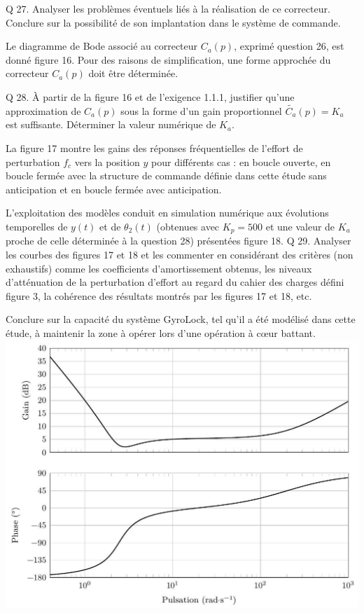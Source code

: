 \documentclass[10pt]{article}
\begin{document}
Q 27. Analyser les problèmes éventuels liés à la réalisation de ce correcteur. Conclure sur la possibilité de son implantation dans le système de commande.

Le diagramme de Bode associé au correcteur $C_{a}(p)$, exprimé question 26, est donné figure 16. Pour des raisons de simplification, une forme approchée du correcteur $C_{a}(p)$ doit être déterminée.

Q 28. À partir de la figure 16 et de l'exigence 1.1.1, justifier qu'une approximation de $C_{a}(p)$ sous la forme d'un gain proportionnel $\widetilde{C_{a}}(p)=K_{a}$ est suffisante. Déterminer la valeur numérique de $K_{a}$.

La figure 17 montre les gains des réponses fréquentielles de l'effort de perturbation $f_{c}$ vers la position $y$ pour différents cas : en boucle ouverte, en boucle fermée avec la structure de commande définie dans cette étude sans anticipation et en boucle fermée avec anticipation.

L'exploitation des modèles conduit en simulation numérique aux évolutions temporelles de $y(t)$ et de $\theta_{2}(t)$ (obtenues avec $K_{p}=500$ et une valeur de $K_{a}$ proche de celle déterminée à la question 28) présentées figure 18. Q 29. Analyser les courbes des figures 17 et 18 et les commenter en considérant des critères (non exhaustifs) comme les coefficients d'amortissement obtenus, les niveaux d'atténuation de la perturbation d'effort au regard du cahier des charges défini figure 3, la cohérence des résultats montrés par les figures 17 et 18, etc.

Conclure sur la capacité du système GyroLock, tel qu'il a été modélisé dans cette étude, à maintenir la zone à opérer lors d'une opération à cœur battant.
\includegraphics[max width=\textwidth, center]{2023_07_26_54f5e859400a10e656ddg-10(1)}
\end{document}
